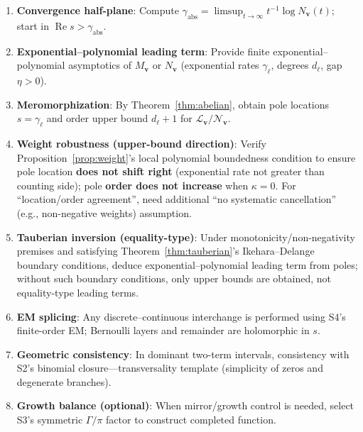 \documentclass[11pt,a4paper]{article}
\theoremstyle{remark}
\DeclareMathOperator{\Re}{Re}
\begin{document}
\begin{enumerate}
\item \textbf{Convergence half-plane}: Compute $\gamma_{\mathrm{abs}}=\limsup_{t\to\infty}t^{-1}\log N_{\mathbf{v}}(t)$; start in $\Re s>\gamma_{\mathrm{abs}}$.

\item \textbf{Exponential--polynomial leading term}: Provide finite exponential--polynomial asymptotics of $M_{\mathbf{v}}$ or $N_{\mathbf{v}}$ (exponential rates $\gamma_\ell$, degrees $d_\ell$, gap $\eta>0$).

\item \textbf{Meromorphization}: By Theorem~\ref{thm:abelian}, obtain pole locations $s=\gamma_\ell$ and order upper bound $d_\ell+1$ for $\mathcal{L}_{\mathbf{v}}/\mathscr{N}_{\mathbf{v}}$.

\item \textbf{Weight robustness (upper-bound direction)}: Verify Proposition~\ref{prop:weight}'s local polynomial boundedness condition to ensure pole location \textbf{does not shift right} (exponential rate not greater than counting side); pole \textbf{order does not increase} when $\kappa=0$. For ``location/order agreement'', need additional ``no systematic cancellation'' (e.g., non-negative weights) assumption.

\item \textbf{Tauberian inversion (equality-type)}: Under monotonicity/non-negativity premises and satisfying Theorem~\ref{thm:tauberian}'s Ikehara--Delange boundary conditions, deduce exponential--polynomial leading term from poles; without such boundary conditions, only upper bounds are obtained, not equality-type leading terms.

\item \textbf{EM splicing}: Any discrete--continuous interchange is performed using S4's finite-order EM; Bernoulli layers and remainder are holomorphic in $s$.

\item \textbf{Geometric consistency}: In dominant two-term intervals, consistency with S2's binomial closure---transversality template (simplicity of zeros and degenerate branches).

\item \textbf{Growth balance (optional)}: When mirror/growth control is needed, select S3's symmetric $\Gamma/\pi$ factor to construct completed function.
\end{enumerate}

\appendix
\end{document}
